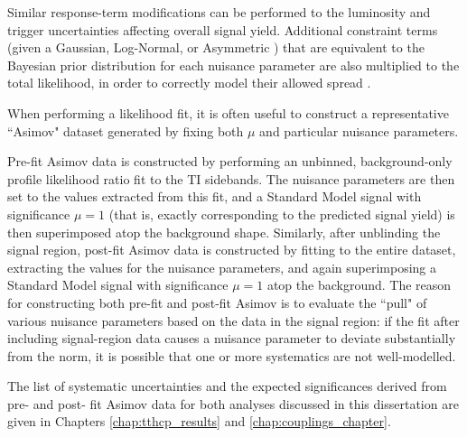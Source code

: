 Similar response-term modifications can be performed to the luminosity and trigger uncertainties affecting overall signal yield. Additional constraint terms (given a Gaussian, Log-Normal, or Asymmetric \cite{Cranmer}) that are equivalent to the Bayesian prior distribution for each nuisance parameter are also multiplied to the total likelihood, in order to correctly model their allowed spread \cite{JSConway}.

When performing a likelihood fit, it is often useful to construct a representative ``Asimov" dataset generated by fixing both $\mu$ and particular nuisance parameters.

Pre-fit Asimov data is constructed by performing an unbinned, background-only profile likelihood ratio fit to the TI sidebands. The nuisance parameters are then set to the values extracted from this fit, and a Standard Model signal with significance $\mu = 1$ (that is, exactly corresponding to the predicted signal yield) is then superimposed atop the background shape. Similarly, after unblinding the signal region, post-fit Asimov data is constructed by fitting to the entire dataset, extracting the values for the nuisance parameters, and again superimposing a Standard Model signal with significance $\mu = 1$ atop the background. The reason for constructing both pre-fit and post-fit Asimov is to evaluate the ``pull" of various nuisance parameters based on the data in the signal region: if the fit after including signal-region data causes a nuisance parameter to deviate substantially from the norm, it is possible that one or more systematics are not well-modelled.

The list of systematic uncertainties and the expected significances derived from pre- and post- fit Asimov data for both analyses discussed in this dissertation are given in Chapters \ref{chap:tthcp_results} and \ref{chap:couplings_chapter}.
